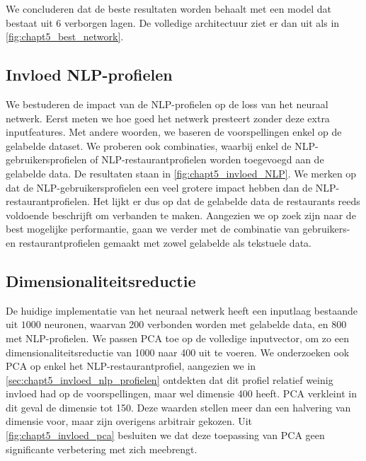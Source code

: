We concluderen dat de beste resultaten worden behaalt met een model dat bestaat uit 6 verborgen lagen. De volledige architectuur ziet er dan uit als in \autoref{fig:chapt5_best_network}.






\subsection{Invloed NLP-profielen}
\label{sec:chapt5_invloed_nlp_profielen}
We bestuderen de impact van de NLP-profielen op de loss van het neuraal netwerk. Eerst meten we hoe goed het netwerk presteert zonder deze extra inputfeatures. Met andere woorden, we baseren de voorspellingen enkel op de gelabelde dataset. We proberen ook combinaties, waarbij enkel de NLP-gebruikersprofielen of NLP-restaurantprofielen worden toegevoegd aan de gelabelde data. De resultaten staan in \autoref{fig:chapt5_invloed_NLP}. We merken op dat de NLP-gebruikersprofielen een veel grotere impact hebben dan de NLP-restaurantprofielen. Het lijkt er dus op dat de gelabelde data de restaurants reeds voldoende beschrijft om verbanden te maken. Aangezien we op zoek zijn naar de best mogelijke performantie, gaan we verder met de combinatie van gebruikers- en restaurantprofielen gemaakt met zowel gelabelde als tekstuele data.



\subsection{Dimensionaliteitsreductie}
De huidige implementatie van het neuraal netwerk heeft een inputlaag bestaande uit $1000$ neuronen, waarvan 200 verbonden worden met gelabelde data, en 800 met NLP-profielen. We passen PCA toe op de volledige inputvector, om zo een dimensionaliteitsreductie van 1000 naar 400 uit te voeren. We onderzoeken ook PCA op enkel het NLP-restaurantprofiel, aangezien we in \autoref{sec:chapt5_invloed_nlp_profielen} ontdekten dat dit profiel relatief weinig invloed had op de voorspellingen, maar wel dimensie 400 heeft. PCA verkleint in dit geval de dimensie tot 150. Deze waarden stellen meer dan een halvering van dimensie voor, maar zijn overigens arbitrair gekozen. Uit \autoref{fig:chapt5_invloed_pca} besluiten we dat deze toepassing van PCA geen significante verbetering met zich meebrengt.

